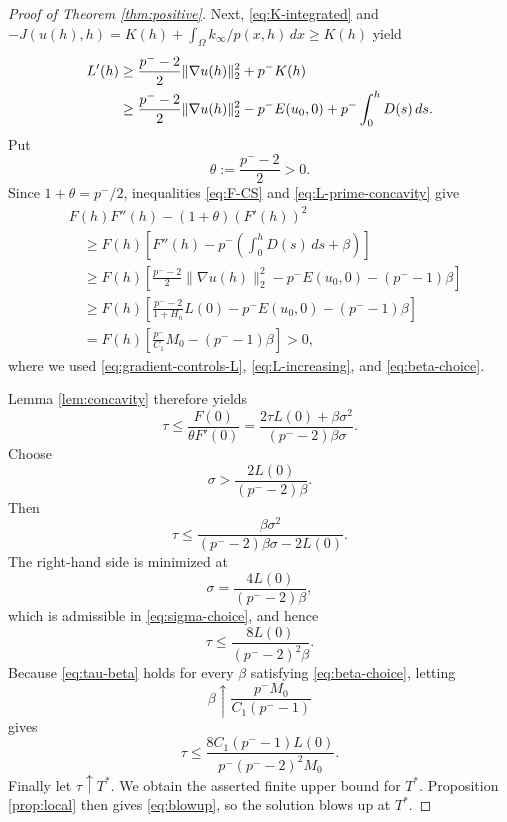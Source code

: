 \documentclass[10pt,a4paper]{amsart}
\begin{document}
\begin{proof}[Proof of Theorem \ref{thm:positive}]
	Next, \eqref{eq:K-integrated} and $-J(u(h),h)=K(h)+\int_\Omega k_\infty/p(x,h)\,dx\ge K(h)$ yield
	\begin{align}
	L'(h)
	&\ge \frac{p^- -2}{2}\|\nabla u(h)\|_2^2+p^-K(h)\notag\\
	&\ge \frac{p^- -2}{2}\|\nabla u(h)\|_2^2
	-p^-E(u_0,0)+p^-\int_0^hD(s)\,ds. \label{eq:L-prime-concavity}
	\end{align}
	Put
	\[
	\theta:=\frac{p^- -2}{2}>0.
	\]
	Since $1+\theta=p^-/2$, inequalities \eqref{eq:F-CS} and \eqref{eq:L-prime-concavity} give
	\begin{align*}
	&F(h)F''(h)-(1+\theta)(F'(h))^2\\
	&\quad\ge F(h)\left[
	F''(h)-p^-\left(\int_0^hD(s)\,ds+\beta\right)
	\right]\\
	&\quad\ge F(h)\left[
	\frac{p^- -2}{2}\|\nabla u(h)\|_2^2
	-p^-E(u_0,0)-(p^- -1)\beta
	\right]\\
	&\quad\ge F(h)\left[
	\frac{p^- -2}{1+H_n}L(0)
	-p^-E(u_0,0)-(p^- -1)\beta
	\right]\\
	&\quad=F(h)\left[
	\frac{p^-}{C_1}M_0-(p^- -1)\beta
	\right]>0,
	\end{align*}
	where we used \eqref{eq:gradient-controls-L}, \eqref{eq:L-increasing}, and \eqref{eq:beta-choice}.

	Lemma \ref{lem:concavity} therefore yields
	\[
	\tau\le\frac{F(0)}{\theta F'(0)}
	=\frac{2\tau L(0)+\beta\sigma^2}
	{(p^- -2)\beta\sigma}.
	\]
	Choose
	\begin{equation}\label{eq:sigma-choice}
	\sigma>\frac{2L(0)}{(p^- -2)\beta}.
	\end{equation}
	Then
	\[
	\tau\le
	\frac{\beta\sigma^2}
	{(p^- -2)\beta\sigma-2L(0)}.
	\]
	The right-hand side is minimized at
	\[
	\sigma=\frac{4L(0)}{(p^- -2)\beta},
	\]
	which is admissible in \eqref{eq:sigma-choice}, and hence
	\begin{equation}\label{eq:tau-beta}
	\tau\le\frac{8L(0)}{(p^- -2)^2\beta}.
	\end{equation}
	Because \eqref{eq:tau-beta} holds for every $\beta$ satisfying \eqref{eq:beta-choice}, letting
	\[
	\beta\uparrow\frac{p^-M_0}{C_1(p^- -1)}
	\]
	gives
	\[
	\tau\le
	\frac{8C_1(p^- -1)L(0)}
	{p^-(p^- -2)^2M_0}.
	\]
	Finally let $\tau\uparrow T^*$. We obtain the asserted finite upper bound for $T^*$.
	Proposition \ref{prop:local} then gives \eqref{eq:blowup}, so the solution blows up at $T^*$.
\end{proof}
\end{document}
